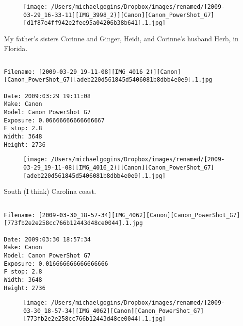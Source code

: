 \documentclass[11pt,letter,DIV=14,paper=landscape]{scrbook}
\begin{document}
\begin{figure}
\texttt{[image: /Users/michaelgogins/Dropbox/images/renamed/[2009-03-29\_16-33-11][IMG\_3998\_2)][Canon][Canon\_PowerShot\_G7][d1f87e4ff942e2fee95a04206b38b641].1.jpg]}
\end{figure}
    
\clearpage
\noindent My father's sisters Corinne and Ginger, Heidi, and Corinne's husband Herb, in Florida.
\noindent
\begin{lstlisting}

Filename: [2009-03-29_19-11-08][IMG_4016_2)][Canon][Canon_PowerShot_G7][adeb220d561845d5406081b8dbb4e0e9].1.jpg

Date: 2009:03:29 19:11:08
Make: Canon
Model: Canon PowerShot G7
Exposure: 0.06666666666666667
F stop: 2.8
Width: 3648
Height: 2736
\end{lstlisting}
\clearpage

\begin{figure}
\texttt{[image: /Users/michaelgogins/Dropbox/images/renamed/[2009-03-29\_19-11-08][IMG\_4016\_2)][Canon][Canon\_PowerShot\_G7][adeb220d561845d5406081b8dbb4e0e9].1.jpg]}
\end{figure}
    
\clearpage
\noindent South (I think) Carolina coast.
\noindent
\begin{lstlisting}

Filename: [2009-03-30_18-57-34][IMG_4062][Canon][Canon_PowerShot_G7][773fb2e2e258cc766b12443d48ce0044].1.jpg

Date: 2009:03:30 18:57:34
Make: Canon
Model: Canon PowerShot G7
Exposure: 0.016666666666666666
F stop: 2.8
Width: 3648
Height: 2736
\end{lstlisting}
\clearpage

\begin{figure}
\texttt{[image: /Users/michaelgogins/Dropbox/images/renamed/[2009-03-30\_18-57-34][IMG\_4062][Canon][Canon\_PowerShot\_G7][773fb2e2e258cc766b12443d48ce0044].1.jpg]}
\end{figure}
    
\end{document}
